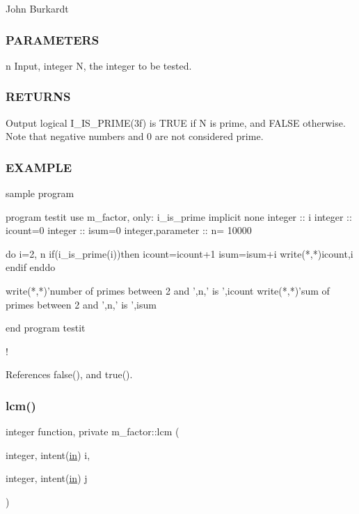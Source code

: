 John Burkardt

\subsubsection*{P\+A\+R\+A\+M\+E\+T\+E\+RS}

n Input, integer N, the integer to be tested. \subsubsection*{R\+E\+T\+U\+R\+NS}

Output logical I\+\_\+\+I\+S\+\_\+\+P\+R\+I\+M\+E(3f) is T\+R\+UE if N is prime, and F\+A\+L\+SE otherwise. Note that negative numbers and 0 are not considered prime. \subsubsection*{E\+X\+A\+M\+P\+LE}

\begin{DoxyVerb}sample program

 program testit
 use m_factor, only: i_is_prime
 implicit none
 integer  :: i
 integer  :: icount=0
 integer  :: isum=0
 integer,parameter :: n= 10000

 do i=2, n
    if(i_is_prime(i))then
       icount=icount+1
       isum=isum+i
       write(*,*)icount,i
    endif
 enddo

 write(*,*)'number of primes between 2 and ',n,' is ',icount
 write(*,*)'sum of primes between 2 and ',n,' is ',isum

 end program testit
\end{DoxyVerb}
 ! 

References false(), and true().

\mbox{\label{namespacem__factor_a363e0b451d99647a6230a308ffccc73c}} 
\subsubsection{\texorpdfstring{lcm()}{lcm()}}
{\footnotesize\ttfamily integer function, private m\+\_\+factor\+::lcm (\begin{DoxyParamCaption}\item[{integer, intent(\hyperlink{M__journal_83_8txt_afce72651d1eed785a2132bee863b2f38}{in})}]{i,  }\item[{integer, intent(\hyperlink{M__journal_83_8txt_afce72651d1eed785a2132bee863b2f38}{in})}]{j }\end{DoxyParamCaption})\hspace{0.3cm}{\ttfamily [private]}}



